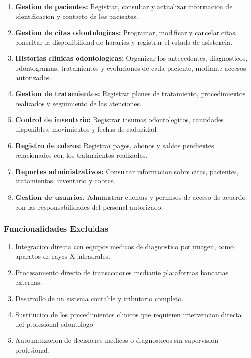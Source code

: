 \documentclass[12pt,a4paper]{article}
\begin{document}
\begin{enumerate}
    \item \textbf{Gestion de pacientes:}
    Registrar, consultar y actualizar informacion
    de identificacion y contacto de los pacientes.

    \item \textbf{Gestion de citas odontologicas:}
    Programar, modificar y cancelar citas, consultar
    la disponibilidad de horarios y registrar
    el estado de asistencia.

    \item \textbf{Historias clinicas odontologicas:}
    Organizar los antecedentes, diagnosticos,
    odontogramas, tratamientos y evoluciones
    de cada paciente, mediante accesos autorizados.

    \item \textbf{Gestion de tratamientos:}
    Registrar planes de tratamiento, procedimientos
    realizados y seguimiento de las atenciones.

    \item \textbf{Control de inventario:}
    Registrar insumos odontologicos, cantidades
    disponibles, movimientos y fechas de caducidad.

    \item \textbf{Registro de cobros:}
    Registrar pagos, abonos y saldos pendientes
    relacionados con los tratamientos realizados.

    \item \textbf{Reportes administrativos:}
    Consultar informacion sobre citas, pacientes,
    tratamientos, inventario y cobros.

    \item \textbf{Gestion de usuarios:}
    Administrar cuentas y permisos de acceso
    de acuerdo con las responsabilidades
    del personal autorizado.
\end{enumerate}

\subsubsection{Funcionalidades Excluidas}

\begin{enumerate}
    \item Integracion directa con equipos medicos
    de diagnostico por imagen, como aparatos
    de rayos X intraorales.

    \item Procesamiento directo de transacciones
    mediante plataformas bancarias externas.

    \item Desarrollo de un sistema contable
    y tributario completo.

    \item Sustitucion de los procedimientos
    clinicos que requieren intervencion
    directa del profesional odontologo.

    \item Automatizacion de decisiones medicas
    o diagnosticos sin supervision profesional.
\end{enumerate}
\end{document}
